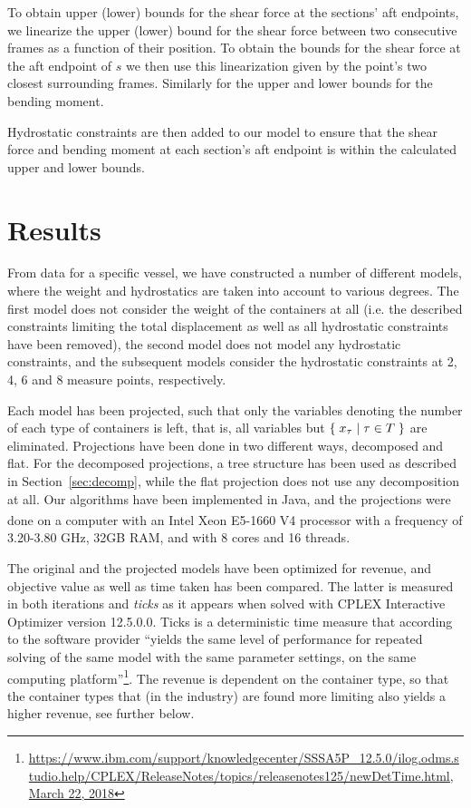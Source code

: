 To obtain upper (lower) bounds for the shear force at the sections' aft endpoints,  
we linearize the upper (lower) bound for the shear force between two consecutive frames as a function of their position. To obtain the bounds for the shear force at the aft endpoint of $s$ we then use this linearization given by the point's two closest surrounding frames. Similarly for the upper and lower bounds for the bending moment.

Hydrostatic constraints are then added to our model to ensure that the shear force and bending moment at each section's aft endpoint is within the calculated upper and lower bounds.

\section{Results}\label{sec:results}
From data for a specific vessel, we have constructed a number of different models, where the weight and hydrostatics are taken into account to various degrees. The first model does not consider the weight of the containers at all (i.e. the described constraints limiting the total displacement as well as all hydrostatic constraints have been removed), the second model does not model any hydrostatic constraints, and the subsequent models consider the hydrostatic constraints at 2, 4, 6 and 8 measure points, respectively.

Each model has been projected, such that only the variables denoting the number of each type of containers is left, that is, all variables but $\{\;{x_\tau}\;|\;{\tau\in T}\;\}$ are eliminated. 
Projections have been done in two different ways, decomposed and flat. For the decomposed projections, a tree structure has been used as described in Section~\ref{sec:decomp}, while the flat projection does not use any decomposition at all. 
Our algorithms have been implemented in Java, and the projections were done on a computer with an {Intel\textsuperscript{\textregistered} Xeon\textsuperscript{\textregistered} E5-1660 V4 processor with a frequency of 3.20-3.80 GHz, 32GB RAM, and with 8 cores and 16 threads.}

The original and the projected models have been optimized for revenue, and objective value as well as time taken has been compared. The latter is measured in both iterations and \emph{ticks} as it appears when solved with CPLEX Interactive Optimizer version 12.5.0.0. Ticks is a deterministic time measure that according to the software provider ``yields the same level of performance for repeated solving of the same model with the same parameter settings, on the same computing platform''\footnote{\url{https://www.ibm.com/support/knowledgecenter/SSSA5P_12.5.0/ilog.odms.studio.help/CPLEX/ReleaseNotes/topics/releasenotes125/newDetTime.html, March 22, 2018}}. 
The revenue is dependent on the container type, so that the container types that (in the industry) are found more limiting also yields a higher revenue, see further below. 

